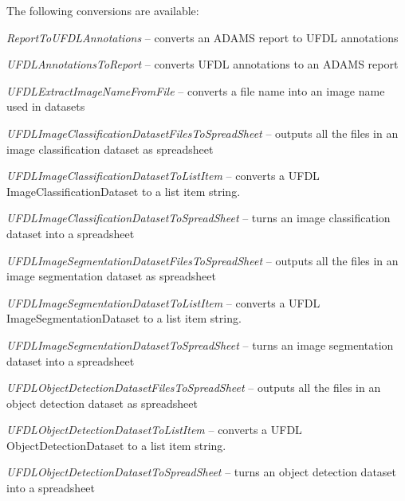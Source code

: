 \documentclass[a4paper]{book}
\begin{document}
The following conversions are available:
\begin{tight_itemize}
  \item \textit{ReportToUFDLAnnotations} -- converts an ADAMS report to UFDL annotations
  \item \textit{UFDLAnnotationsToReport} -- converts UFDL annotations to an ADAMS report
  \item \textit{UFDLExtractImageNameFromFile} -- converts a file name into an image name used in datasets
  \item \textit{UFDLImageClassificationDatasetFilesToSpreadSheet} -- outputs all the files in an image classification dataset as spreadsheet
  \item \textit{UFDLImageClassificationDatasetToListItem} -- converts a UFDL ImageClassificationDataset to a list item string.
  \item \textit{UFDLImageClassificationDatasetToSpreadSheet} -- turns an image classification dataset into a spreadsheet
  \item \textit{UFDLImageSegmentationDatasetFilesToSpreadSheet} -- outputs all the files in an image segmentation dataset as spreadsheet
  \item \textit{UFDLImageSegmentationDatasetToListItem} -- converts a UFDL ImageSegmentationDataset to a list item string.
  \item \textit{UFDLImageSegmentationDatasetToSpreadSheet} -- turns an image segmentation dataset into a spreadsheet
  \item \textit{UFDLObjectDetectionDatasetFilesToSpreadSheet} -- outputs all the files in an object detection dataset as spreadsheet
  \item \textit{UFDLObjectDetectionDatasetToListItem} -- converts a UFDL ObjectDetectionDataset to a list item string.
  \item \textit{UFDLObjectDetectionDatasetToSpreadSheet} -- turns an object detection dataset into a spreadsheet
\end{tight_itemize}
\end{document}
